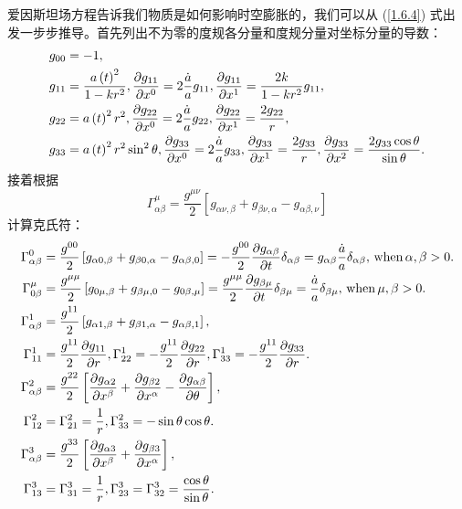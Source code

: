 \documentclass[../天体物理基础.tex]{subfiles}
\begin{document}
爱因斯坦场方程告诉我们物质是如何影响时空膨胀的，我们可以从 (\ref{1.6.4}) 式出发一步步推导。首先列出不为零的度规各分量和度规分量对坐标分量的导数：
\begin{align}
g_{00}&=-1,\notag\\
g_{11}&=\frac{a\left(t\right)^{2}}{1-kr^{2}},\frac{\partial{}g_{11}}{\partial{}x^{0}}=2\frac{\dot a}{a}g_{11},\frac{\partial{}g_{11}}{\partial{}x^{1}}=\frac{2k}{1-kr^{2}}g_{11},\notag\\
g_{22}&=a\left(t\right)^{2}r^{2},\frac{\partial{}g_{22}}{\partial{}x^{0}}=2\frac{\dot a}{a}g_{22},\frac{\partial{}g_{22}}{\partial{}x^{1}}=\frac{2g_{22}}{r},\notag\\
g_{33}&=a\left(t\right)^{2}r^{2}\sin^{2}\theta,\frac{\partial{}g_{33}}{\partial{}x^{0}}=2\frac{\dot a}{a}g_{33},\frac{\partial{}g_{33}}{\partial{}x^{1}}=\frac{2g_{33}}{r},\frac{\partial{}g_{33}}{\partial{}x^{2}}=\frac{2g_{33}\cos\theta}{\sin\theta}.\notag
\end{align}
接着根据
\begin{equation}
\Gamma_{\alpha\beta}^\mu=\frac{g^{\mu\nu}}{2}\left[g_{\alpha\nu,\beta}+g_{\beta\nu,\alpha}-g_{\alpha\beta,\nu}\right]
\end{equation}
计算克氏符：
\begin{align}
\Gamma_{\alpha\beta}^0&=\frac{g^{00}}{2}\left[g_{\alpha0,\beta}+g_{\beta0,\alpha}-g_{\alpha\beta,0}\right]=-\frac{g^{00}}{2}\frac{\partial{}g_{\alpha\beta}}{\partial{}t}\delta_{\alpha\beta}=g_{\alpha\beta}\frac{\dot a}{a}\delta_{\alpha\beta},\,\text{when}\,\alpha,\beta>0.\notag\\
\Gamma_{0\beta}^\mu&=\frac{g^{\mu\mu}}{2}\left[g_{0\mu,\beta}+g_{\beta\mu,0}-g_{0\beta,\mu}\right]=\frac{g^{\mu\mu}}{2}\frac{\partial{}g_{\beta\mu}}{\partial{}t}\delta_{\beta\mu}=\frac{\dot a}{a}\delta_{\beta\mu},\,\text{when}\,\mu,\beta>0.\notag\\
\Gamma_{\alpha\beta}^1&=\frac{g^{11}}{2}\left[g_{\alpha1,\beta}+g_{\beta1,\alpha}-g_{\alpha\beta,1}\right],\notag\\
\Gamma_{11}^{1}&=\frac{g^{11}}{2}\frac{\partial{}g_{11}}{\partial{}r},\Gamma_{22}^{1}=-\frac{g^{11}}{2}\frac{\partial{}g_{22}}{\partial{}r},\Gamma_{33}^{1}=-\frac{g^{11}}{2}\frac{\partial{}g_{33}}{\partial{}r}.\notag\\
\Gamma_{\alpha\beta}^{2}&=\frac{g^{22}}{2}\left[\frac{\partial{}g_{\alpha2}}{\partial{}x^\beta}+\frac{\partial{}g_{\beta2}}{\partial{}x^\alpha}-\frac{\partial{}g_{\alpha\beta}}{\partial{}\theta}\right],\notag\\
\Gamma_{12}^{2}&=\Gamma_{21}^{2}=\frac{1}{r},\Gamma_{33}^{2}=-\sin\theta\cos\theta.\notag\\
\Gamma_{\alpha\beta}^{3}&=\frac{g^{33}}{2}\left[\frac{\partial{}g_{\alpha3}}{\partial{}x^\beta}+\frac{\partial{}g_{\beta3}}{\partial{}x^\alpha}\right],\notag\\
\Gamma_{13}^{3}&=\Gamma_{31}^{3}=\frac{1}{r},\Gamma_{23}^{3}=\Gamma_{32}^{3}=\frac{\cos\theta}{\sin\theta}.\notag
\end{align}
\end{document}
